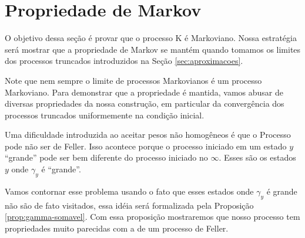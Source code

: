 
\section{Propriedade de Markov}
\label{sec:prop-markov}

O objetivo dessa seção é provar que o processo K é Markoviano. Nossa
estratégia será mostrar que a propriedade de Markov se mantém quando
tomamos os limites dos processos truncados introduzidos na Seção
\ref{sec:aproximacoes}.

Note que nem sempre o limite de processos Markovianos é um processo
Markoviano. Para demonstrar que a propriedade é mantida, vamos abusar
de diversas propriedades da nossa construção, em particular da
convergência dos processos truncados uniformemente na condição
inicial.

Uma dificuldade introduzida ao aceitar pesos não homogêneos é que o
Processo pode não ser de Feller. Isso acontece porque o processo
iniciado em um estado $y$ ``grande'' pode ser bem diferente do
processo iniciado no $\infty$. Esses são os estados $y$ onde
$\gamma_y$ é ``grande''.

Vamos contornar esse problema usando o fato que esses estados onde
$\gamma_y$ é grande não são de fato visitados, essa idéia será
formalizada pela Proposição \ref{prop:gamma-somavel}. Com essa
proposição mostraremos que nosso processo tem propriedades muito
parecidas com a de um processo de Feller.

